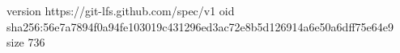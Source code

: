 version https://git-lfs.github.com/spec/v1
oid sha256:56e7a7894f0a94fe103019c431296ed3ac72e8b5d126914a6e50a6dff75e64e9
size 736
